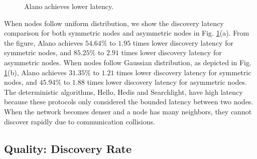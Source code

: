 \begin{figure}[!h]
\centering
{}
\hspace{0.01in}
\caption{Alano achieves lower latency.}
\label{fig_latency}
\end{figure}

When nodes follow uniform distribution, we show the discovery latency comparison for both symmetric nodes and asymmetric nodes in Fig. \ref{fig_latency}(a).
From the figure, Alano achieves $54.64\%$ to $1.95$ times lower discovery latency for symmetric nodes, and $85.25\%$ to $2.91$ times lower discovery latency for asymmetric nodes.
When nodes follow Gaussian distribution, as depicted in Fig. \ref{fig_latency}(b), 
Alano achieves $31.35\%$ to $1.21$ times lower discovery latency for symmetric nodes, and $45.94\%$ to $1.88$ times lower discovery latency for asymmetric nodes.
The deterministic algorithms, Hello, Hedis and Searchlight, have high latency because these protocols only considered the bounded latency between two nodes. When the network becomes denser and a node has many neighbors, they cannot discover rapidly due to communication collisions.


\subsection{Quality: Discovery Rate}




